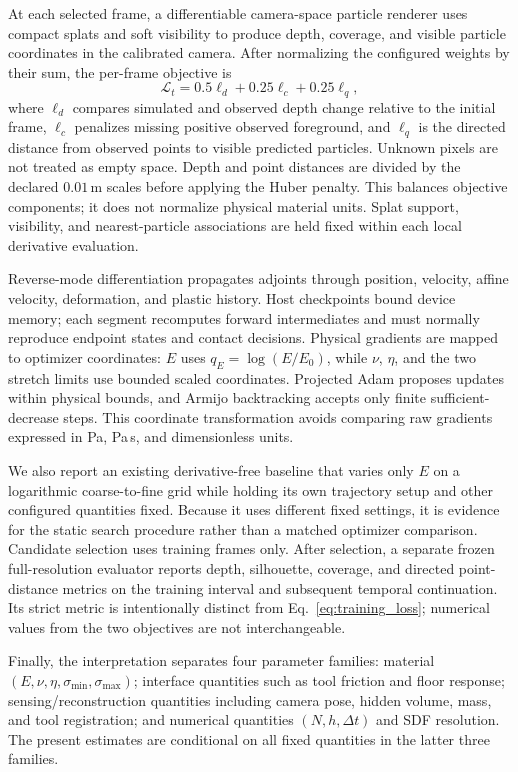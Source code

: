 At each selected frame, a differentiable camera-space particle renderer uses
compact splats and soft visibility to produce depth, coverage, and visible
particle coordinates in the calibrated camera.  After normalizing the
configured weights by their sum, the per-frame objective is
\begin{equation}
 \mathcal{L}_t=0.5\ell_d+0.25\ell_c+0.25\ell_q ,
 \label{eq:training_loss}
\end{equation}
where $\ell_d$ compares simulated and observed depth change relative to the
initial frame, $\ell_c$ penalizes missing positive observed foreground, and
$\ell_q$ is the directed distance from observed points to visible predicted
particles.  Unknown pixels are not treated as empty space.  Depth and point
distances are divided by the declared $0.01\,$m scales before applying the
Huber penalty.  This balances objective components; it does not normalize
physical material units.  Splat support, visibility, and nearest-particle
associations are held fixed within each local derivative evaluation.

Reverse-mode differentiation propagates adjoints through position, velocity,
affine velocity, deformation, and plastic history.  Host checkpoints bound
device memory; each segment recomputes forward intermediates and must normally
reproduce endpoint states and contact decisions.  Physical gradients are
mapped to optimizer coordinates: $E$ uses $q_E=\log(E/E_0)$, while $\nu$,
$\eta$, and the two stretch limits use bounded scaled coordinates.  Projected
Adam proposes updates within physical bounds, and Armijo backtracking accepts
only finite sufficient-decrease steps.  This coordinate transformation avoids
comparing raw gradients expressed in Pa, Pa\,s, and dimensionless units.

We also report an existing derivative-free baseline that varies only $E$ on
a logarithmic coarse-to-fine grid while holding its own trajectory setup and
other configured quantities fixed.  Because it uses different fixed settings,
it is evidence for the static search procedure rather than a matched optimizer
comparison. Candidate selection uses training frames only. After selection, a separate frozen
full-resolution evaluator reports depth, silhouette, coverage, and directed
point-distance metrics on the training interval and subsequent temporal
continuation.  Its strict metric is intentionally distinct from
Eq.~\eqref{eq:training_loss}; numerical values from the two objectives are not
interchangeable.

Finally, the interpretation separates four parameter families: material
$(E,\nu,\eta,\sigma_{\min},\sigma_{\max})$; interface quantities such as tool
friction and floor response; sensing/reconstruction quantities including
camera pose, hidden volume, mass, and tool registration; and numerical
quantities $(N,h,\Delta t)$ and SDF resolution.  The present estimates are
conditional on all fixed quantities in the latter three families.
